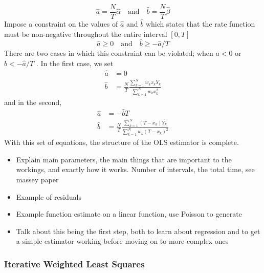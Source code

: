 \documentclass[a4paper,11pt]{article}
\begin{document}
\begin{equation}
\hat{a}=\frac{N}{T}\hat{\alpha}\quad\text{and}\quad
\hat{b}=\frac{N}{T}\hat{\beta}
\end{equation}
Impose a constraint on the values of $\hat{a}$ and $\hat{b}$ which
states that the rate function must be non-negative throughout the entire
interval $[0,T]$ \cite{massey1996estimating}
\begin{equation}
\hat{a}\geq 0\quad \text{and}\quad
\hat{b}\geq -\hat{a}/T
\end{equation}
There are two cases in which this constraint can be violated; when $a<0$ or
$b<-\hat{a}/T$ \cite{massey1996estimating}. In the first case, we set
\begin{align}
\hat{a}&=0\\
\hat{b}&=\frac{N}{T}\frac{\displaystyle \sum_{k=1}^N w_kx_kY_k}{\displaystyle \sum_{k=1}^N w_kx_k^2}
\end{align}
and in the second,
\begin{align}
\hat{a}&=-\hat{b}T\\
\hat{b}&=\frac{N}{T}\frac{\displaystyle \sum_{k=1}^N (T-x_k)Y_k}{\displaystyle \sum_{k=1}^N w_k(T-x_k)^2}
\end{align}
With this set of equations, the structure of the OLS estimator is complete.
\begin{itemize}
\item Explain main parameters, the main things that are important to the workings,
  and exactly how it works. Number of intervals, the total time, see massey paper
\item Example of residuals
\item Example function estimate on a linear function, use Poisson to generate
\item Talk about this being the first step, both to learn about regression and to
  get a simple estimator working before moving on to more complex ones
\end{itemize}
\subsubsection{Iterative Weighted Least Squares}
\label{sec-4-1-2}
\end{document}
